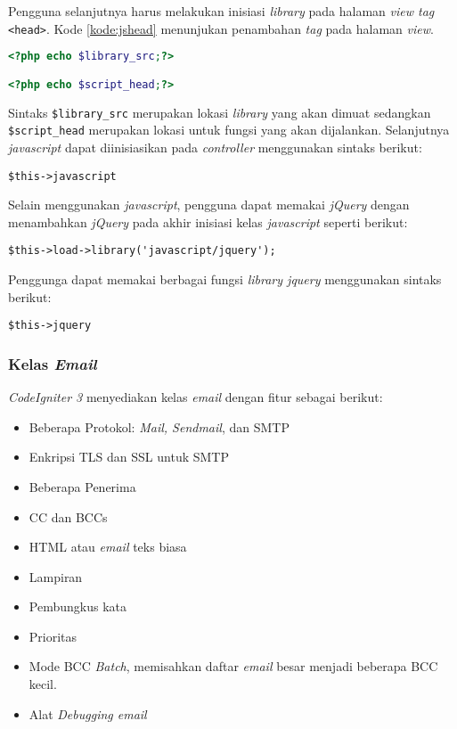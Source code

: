 Pengguna selanjutnya harus melakukan inisiasi \textit{library} pada halaman \textit{view tag} \verb|<head>|. Kode \ref{kode:jshead} menunjukan penambahan \textit{tag} pada halaman \textit{view}.

\begin{lstlisting}[language=PHP, caption=Contoh penambahan \textit{tag} pada \textit{file} \textit{view}, label=kode:jshead]
<?php echo $library_src;?>

<?php echo $script_head;?>
\end{lstlisting}

Sintaks \verb|$library_src| merupakan lokasi \textit{library} yang akan dimuat sedangkan \verb|$script_head| merupakan lokasi untuk fungsi yang akan dijalankan. Selanjutnya \textit{javascript} dapat diinisiasikan pada \textit{controller} menggunakan sintaks berikut:

\begin{center}
	\verb|$this->javascript|
\end{center}

Selain menggunakan \textit{javascript}, pengguna dapat memakai \textit{jQuery} dengan menambahkan \textit{jQuery} pada akhir inisiasi kelas \textit{javascript} seperti berikut:

\begin{center}
\verb|$this->load->library('javascript/jquery');|
\end{center}

Penggunga dapat memakai berbagai fungsi \textit{library jquery} menggunakan sintaks berikut:

\begin{center}
\verb|$this->jquery|
\end{center}

\subsubsection{Kelas \textit{Email}}
\textit{CodeIgniter 3} menyediakan kelas \textit{email} dengan fitur sebagai berikut:

\begin{itemize}
\item Beberapa Protokol: \textit{Mail, Sendmail}, dan SMTP
\item Enkripsi TLS dan SSL untuk SMTP
\item Beberapa Penerima
\item CC dan BCCs
\item HTML atau \textit{email} teks biasa
\item Lampiran
\item Pembungkus kata
\item Prioritas
\item Mode BCC \textit{Batch}, memisahkan daftar \textit{email} besar menjadi beberapa BCC kecil.
\item Alat \textit{Debugging email}
\end{itemize}

